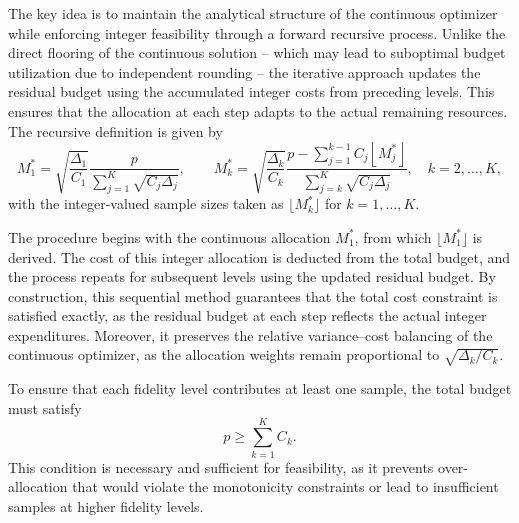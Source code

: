 The key idea is to maintain the analytical structure of the continuous optimizer while enforcing integer feasibility through a forward recursive process. Unlike the direct flooring of the continuous solution -- which may lead to suboptimal budget utilization due to independent rounding -- the iterative approach updates the residual budget using the accumulated integer costs from preceding levels. This ensures that the allocation at each step adapts to the actual remaining resources. The recursive definition is given by
%
\begin{equation}\label{eq:MFMC_New_IntegerValued_Sample_Size}
    M_1^* = \sqrt{\frac{\Delta_1}{C_1}}\frac{p}{\sum_{j=1}^K\sqrt{C_j\Delta_j}}, 
    \qquad 
    M_k^* = \sqrt{\frac{\Delta_k}{C_k}}\frac{p-\sum_{j=1}^{k-1}C_j\left\lfloor M_j^* \right\rfloor}{\sum_{j=k}^K\sqrt{C_j\Delta_j}}, 
    \quad k = 2,\ldots, K,
\end{equation}
%
with the integer-valued sample sizes taken as $\lfloor M_k^* \rfloor$ for $k=1,\ldots,K$.

The procedure begins with the continuous allocation $M_1^*$, from which $\lfloor M_1^* \rfloor$ is derived. The cost of this integer allocation is deducted from the total budget, and the process repeats for subsequent levels using the updated residual budget. By construction, this sequential method guarantees that the total cost constraint is satisfied exactly, as the residual budget at each step reflects the actual integer expenditures. Moreover, it preserves the relative variance–cost balancing of the continuous optimizer, as the allocation weights remain proportional to $\sqrt{\Delta_k/C_k}$.


To ensure that each fidelity level contributes at least one sample, the total budget must satisfy
%
\begin{equation}\label{eq:p_bound}
    p \ge \sum_{k=1}^K C_k.
\end{equation}
%
This condition is necessary and sufficient for feasibility, as it prevents over-allocation that would violate the monotonicity constraints or lead to insufficient samples at higher fidelity levels.

